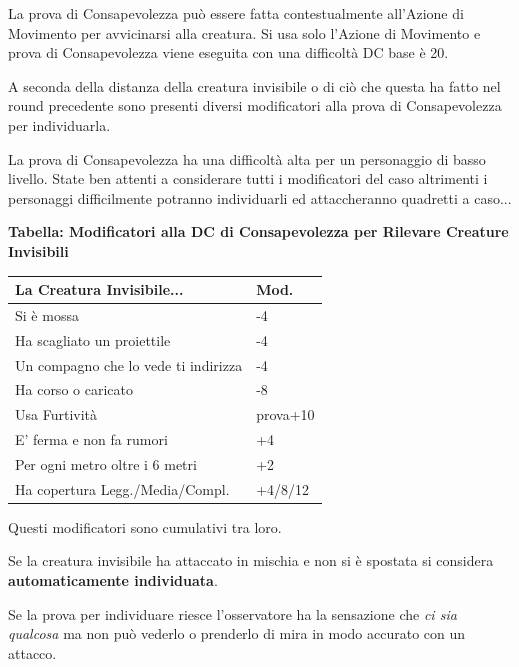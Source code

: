 \begin{multicols}{2}
La prova di Consapevolezza può essere fatta contestualmente all'Azione di Movimento per avvicinarsi alla creatura. Si usa solo l'Azione di Movimento e prova di Consapevolezza viene eseguita con una difficoltà DC base è 20.

A seconda della distanza della creatura invisibile o di ciò che questa ha fatto nel round precedente sono presenti diversi modificatori alla prova di Consapevolezza per individuarla.

\medskip

\begin{changemargin}{0.3cm}{0.3cm}\begin{narratore}
La prova di Consapevolezza ha una difficoltà alta per un personaggio di basso livello. State ben attenti a considerare tutti i modificatori del caso altrimenti i personaggi difficilmente potranno individuarli ed attaccheranno quadretti a caso...
\end{narratore}\end{changemargin}

\bigskip

\textbf{Tabella: Modificatori alla DC di Consapevolezza per Rilevare Creature Invisibili}

\medskip

\noindent\begin{tabularx}{0.48\textwidth}{Xl}
\textbf{La Creatura Invisibile...} & \textbf{Mod.}\\
\toprule
Si è mossa& -4\\
Ha scagliato un proiettile & -4\\
Un compagno che lo vede ti indirizza & -4\\
Ha corso o caricato& -8\\
Usa Furtività & prova+10\\
E' ferma e non fa rumori & +4\\
Per ogni metro oltre i 6 metri & +2\\
Ha copertura Legg./Media/Compl. & +4/8/12
\end{tabularx}

\medskip

Questi modificatori sono cumulativi tra loro.

Se la creatura invisibile ha attaccato in mischia e non si è spostata si considera \textbf{automaticamente individuata}.

Se la prova per individuare riesce l'osservatore ha la sensazione che \emph{ci sia qualcosa} ma non può vederlo o prenderlo di mira in modo accurato con un attacco.


\end{multicols}
